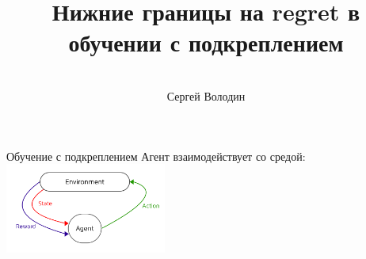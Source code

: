 \documentclass{beamer}
\title[\hbox to 56mm{Обучение с подкреплением  \hfill\insertframenumber\,/\,\inserttotalframenumber}]
{Нижние границы на regret в обучении с подкреплением}
\author[Сергей Володин]{\large \\Сергей Володин}
\institute{\large МФТИ}
\date{}
\begin{document}
\begin{frame}
\titlepage
\end{frame}
\begin{frame}{Обучение с подкреплением}
Агент взаимодействует со средой:
\includegraphics[width=200px]{RL.png}
\end{frame}
\end{document}
